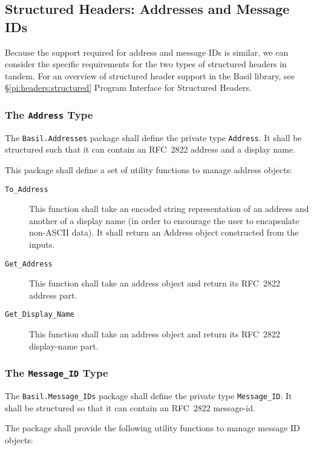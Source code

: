 \documentclass[11pt]{article}
\begin{document}
\subsection{Structured Headers: Addresses and Message IDs}

Because the support required for address and message IDs is similar,
we can consider the specific requirements for the two types of
structured headers in tandem. For an overview of structured header
support in the Basil library, see \S\ref{pi:headers:structured}
Program Interface for Structured Headers.

\subsubsection{The \texttt{Address} Type}

The \texttt{Basil.Addresses} package shall define the private type
\texttt{Address}. It shall be structured such that it can contain an
RFC~2822 address and a display name.

This package shall define a set of utility functions to manage address
objects:

\begin{description}

\item[\texttt{To\_Address}] This function shall take an encoded string
  representation of an address and another of a display name (in order
  to encourage the user to encapsulate non-ASCII data). It shall
  return an Address object constructed from the inputs.

\item[\texttt{Get\_Address}] This function shall take an address
  object and return its RFC~2822 address part.

\item[\texttt{Get\_Display\_Name}] This function shall take an address
  object and return its RFC~2822 display-name part.

\end{description}

\subsubsection{The \texttt{Message\_ID} Type}

The \texttt{Basil.Message\_IDs} package shall define the private type
\texttt{Message\_ID}. It shall be structured so that it can contain an
RFC~2822 message-id.

The package shall provide the following utility functions to manage
message ID objects:
\end{document}
